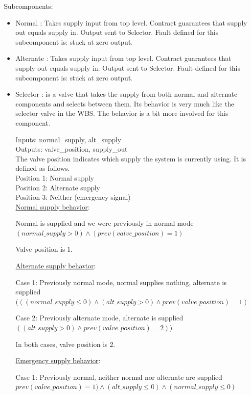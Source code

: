 \documentclass{article}
\begin{document}
Subcomponents: 
\begin{itemize}
\item Normal : Takes supply input from top level. Contract guarantees that supply out equals supply in. Output sent to Selector. Fault defined for this subcomponent is: stuck at zero output.
\item Alternate : Takes supply input from top level. Contract guarantees that supply out equals supply in. Output sent to Selector. Fault defined for this subcomponent is: stuck at zero output.

\item Selector : is a valve that takes the supply from both normal and alternate components and selects between them. Its behavior is very much like the selector valve in the WBS. The behavior is a bit more involved for this component. 

Inputs: normal\_supply, alt\_supply \\
Outputs: valve\_position, supply\_out\\

The valve position indicates which supply the system is currently using. It is defined as follows. \\
Position 1: Normal supply\\
Position 2: Alternate supply\\
Position 3: Neither (emergency signal)\\

\underline{Normal supply behavior}: 

Normal is supplied and we were previously in normal mode \\
$(normal\_supply > 0) \land (prev(valve\_position) = 1)$ 

Valve position is 1.

\underline{Alternate supply behavior}: 

Case 1: Previously normal mode, normal supplies nothing, alternate is supplied \\
$(((normal\_supply \leq 0) \land (alt\_supply > 0) \land prev(valve\_position) = 1)$ 

Case 2: Previously alternate mode, alternate is supplied \\
$((alt\_supply > 0) \land prev(valve\_position) = 2))$

In both cases, valve position is 2.

\underline{Emergency supply behavior}: 

Case 1: Previously normal, neither normal nor alternate are supplied \\
$prev(valve\_position) = 1) \land (alt\_supply \leq 0) \land (normal\_supply \leq 0)$


\end{itemize}
\end{document}
